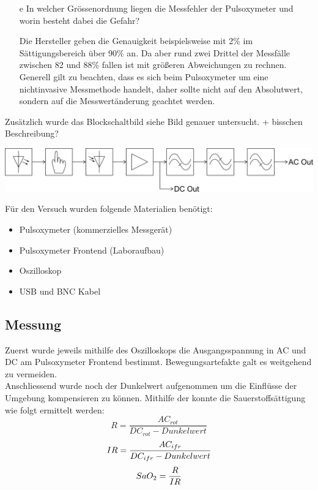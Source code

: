\documentclass[11pt]{scrartcl}
\begin{document}
\begin{itemize}
\begin{equation}
        \end{equation}
        \item[e] In welcher Grössenordnung liegen die Messfehler der Pulsoxymeter und worin
        besteht dabei die Gefahr? 
        \item[] Die Hersteller geben die Genauigkeit beispielsweise mit 2\% im Sättigungsbereich über 90\% an.
        Da aber rund zwei Drittel der Messfälle zwischen 82 und 88\% fallen ist mit größeren Abweichungen zu rechnen. 
        Generell gilt zu beachten, dass es sich beim Pulsoxymeter um eine nichtinvasive Messmethode handelt,
        daher sollte nicht auf den Absolutwert, sondern auf die Messwertänderung geachtet werden.
    \end{itemize}

    Zusätzlich wurde das Blockschaltbild siehe Bild genauer untersucht. + bisschen Beschreibung?

    \includegraphics[width=15cm]{../images/Blockschaltbild}

    Für den Versuch wurden folgende Materialien benötigt:

    \begin{itemize}
        \item  Pulsoxymeter (kommerzielles Messgerät)
        \item Pulsoxymeter Frontend (Laboraufbau)
        \item Oszilloskop
        \item USB und BNC Kabel 
        
    \end{itemize}

    \subsection{Messung}
    Zuerst wurde jeweils mithilfe des Oszilloskops die Ausgangsspannung in AC und DC am Pulsoxymeter Frontend bestimmt. 
    Bewegungsartefakte galt es weitgehend zu vermeiden.\\
    Anschliessend wurde noch der Dunkelwert aufgenommen um die Einflüsse der Umgebung kompensieren zu können.
    Mithilfe der \cite{Pulsoxymetrie} konnte die Sauerstoffsättigung wie folgt ermittelt werden:
    \begin{equation}
        R = \frac{AC_{rot}}{DC_{rot} - Dunkelwert} 
    \end{equation}
    \begin{equation}
        IR = \frac{AC_{ifr}}{DC_{ifr} - Dunkelwert} \\
    \end{equation}
    \begin{equation}
        SaO_{2} = \frac{R}{IR} \\
    \end{equation}
\end{document}

